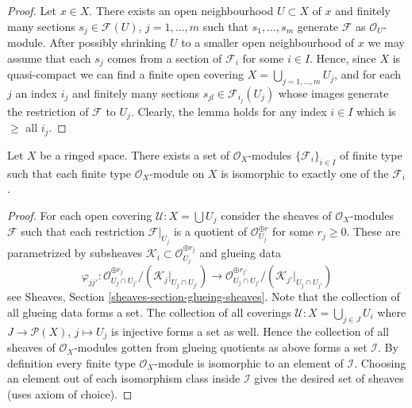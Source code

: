 \begin{proof}
Let $x \in X$. There exists an open neighbourhood
$U \subset X$ of $x$ and finitely many sections
$s_j \in \mathcal{F}(U)$, $j = 1, \ldots, m$ such that
$s_1, \ldots, s_m$ generate $\mathcal{F}$ as $\mathcal{O}_U$-module.
After possibly shrinking $U$ to a smaller open neighbourhood of $x$
we may assume that each $s_j$ comes from a section of $\mathcal{F}_i$
for some $i \in I$.
Hence, since $X$ is quasi-compact we can find a finite open
covering $X = \bigcup_{j = 1, \ldots, m} U_j$, and for each $j$
an index $i_j$ and finitely many sections $s_{jl} \in \mathcal{F}_{i_j}(U_j)$
whose images generate the restriction of $\mathcal{F}$ to
$U_j$. Clearly, the lemma holds for any index $i \in I$ which
is $\geq$ all $i_j$.
\end{proof}

\begin{lemma}
\label{lemma-set-isomorphism-classes-finite-type-modules}
Let $X$ be a ringed space.
There exists a set of $\mathcal{O}_X$-modules
$\{\mathcal{F}_i\}_{i \in I}$ of finite type
such that each finite type $\mathcal{O}_X$-module
on $X$ is isomorphic to exactly one of the $\mathcal{F}_i$.
\end{lemma}

\begin{proof}
For each open covering $\mathcal{U} : X = \bigcup U_j$ consider the
sheaves of $\mathcal{O}_X$-modules $\mathcal{F}$ such that each
restriction $\mathcal{F}|_{U_j}$ is a quotient of
$\mathcal{O}_{U_j}^{\oplus r}$ for some $r_j \geq 0$.
These are parametrized by subsheaves
$\mathcal{K}_i \subset \mathcal{O}_{U_j}^{\oplus r_j}$ and glueing
data
$$
\varphi_{jj'} :
\mathcal{O}_{U_j \cap U_{j'}}^{\oplus r_j}/
(\mathcal{K}_j|_{U_j \cap U_{j'}})
\longrightarrow
\mathcal{O}_{U_j \cap U_{j'}}^{\oplus r_{j'}}/
(\mathcal{K}_{j'}|_{U_j \cap U_{j'}})
$$
see Sheaves, Section \ref{sheaves-section-glueing-sheaves}.
Note that the collection of all glueing data forms a set.
The collection of all coverings $\mathcal{U} : X = \bigcup_{j \in J} U_i$
where $J \to \mathcal{P}(X)$, $j \mapsto U_j$ is injective forms a set as
well. Hence the collection of all sheaves of $\mathcal{O}_X$-modules
gotten from glueing quotients as above forms a set $\mathcal{I}$.
By definition every finite type $\mathcal{O}_X$-module
is isomorphic to an element of $\mathcal{I}$. Choosing an
element out of each isomorphism class inside $\mathcal{I}$
gives the desired set of sheaves (uses axiom of choice).
\end{proof}













